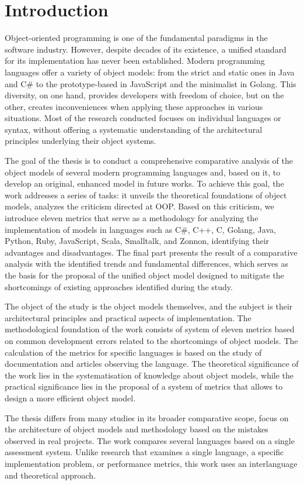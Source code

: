 \chapter{Introduction}


Object-oriented programming is one of the fundamental paradigms in the software industry. However, despite decades of its existence, a unified standard for its implementation has never been established. Modern programming languages offer a variety of object models: from the strict and static ones in Java and C\# to the prototype-based in JavaScript and the minimalist in Golang. This diversity, on one hand, provides developers with freedom of choice, but on the other, creates inconveniences when applying these approaches in various situations. Most of the research conducted focuses on individual languages or syntax, without offering a systematic understanding of the architectural principles underlying their object systems.

The goal of the thesis is to conduct a comprehensive comparative analysis of the object models of several modern programming languages and, based on it, to develop an original, enhanced model in future works. To achieve this goal, the work addresses a series of tasks: it unveils the theoretical foundations of object models, analyzes the criticism directed at OOP. Based on this criticism, we introduce eleven metrics that serve as a methodology for analyzing the implementation of models in languages such as C\#, C++, C, Golang, Java, Python, Ruby, JavaScript, Scala, Smalltalk, and Zonnon, identifying their advantages and disadvantages. The final part presents the result of a comparative analysis with the identified trends and fundamental differences, which serves as the basis for the proposal of the unified object model designed to mitigate the shortcomings of existing approaches identified during the study.

The object of the study is the object models themselves, and the subject is their architectural principles and practical aspects of implementation. The methodological foundation of the work consists of system of eleven metrics based on common development errors related to the shortcomings of object models. The calculation of the metrics for specific languages is based on the study of documentation and articles observing the language. The theoretical significance of the work lies in the systematisation of knowledge about object models, while the practical significance lies in the proposal of a system of metrics that allows to design a more efficient object model.

The thesis differs from many studies in its broader comparative scope, focus on the architecture of object models and methodology based on the mistakes observed in real projects. The work compares several languages based on a single assessment system. Unlike research that examines a single language, a specific implementation problem, or performance metrics, this work uses an interlanguage and theoretical approach. 
